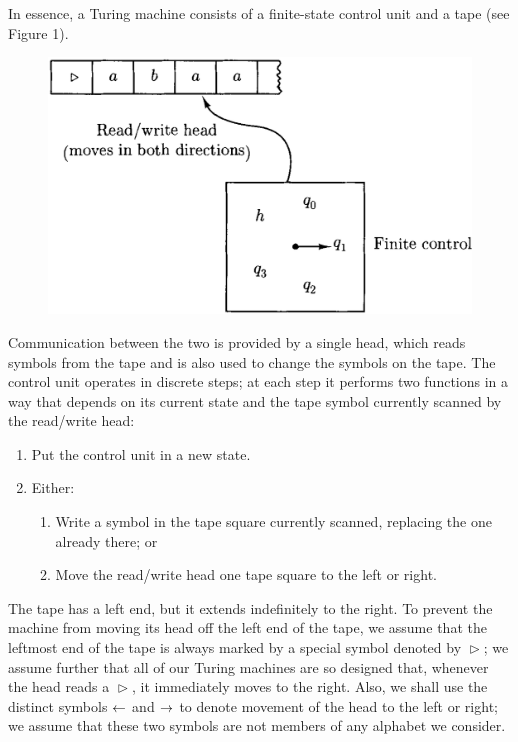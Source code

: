 In essence, a Turing machine consists of a finite-state control unit and a tape (see Figure 1).
\begin{figure}[H]
  \centering
  \includegraphics[width=\linewidth]{img/fig-4.1.png}
  \caption{}
  \label{fig:4.1}
\end{figure}
Communication between the two is provided by a single head, which reads symbols from the tape and is also used to change the symbols on the tape. The control unit operates in discrete steps; at each step it performs two functions in a way that depends on its current state and the tape symbol currently scanned by the read/write head:
\begin{enumerate}
  \item Put the control unit in a new state.
  \item Either: 
    \begin{enumerate}
      \item Write a symbol in the tape square currently scanned, replacing the one already there; or
      \item Move the read/write head one tape square to the left or right.
    \end{enumerate}
\end{enumerate}
The tape has a left end, but it extends indefinitely to the right. To prevent the machine from moving its head off the left end of the tape, we assume that the leftmost end of the tape is always marked by a special symbol denoted by $\vartriangleright$; we assume further that all of our Turing machines are so designed that, whenever the head reads a $\vartriangleright$, it immediately moves to the right. Also, we shall use the distinct symbols $\leftarrow$ and $\rightarrow$ to denote movement of the head to the left or right; we assume that these two symbols are not members of any alphabet we consider.

